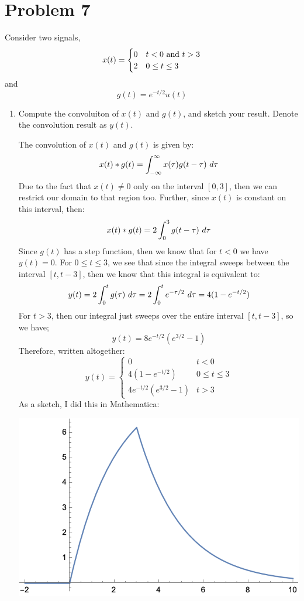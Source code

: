 \documentclass[10pt]{article}
\begin{document}
	\section*{Problem 7} 
	Consider two signals, 
	\[
	x(t) = \begin{cases}
		0 & \text{\(  t< 0 \) and \( t > 3 \)}\\
		2 & 0 \le t \le  3
	\end{cases}
	\] 
	and 
	\[
	g(t) = e^{-t / 2}u(t)
	\] 
	\begin{enumerate}[label=\alph*)]
		\item Compute the convoluiton of  \( x(t) \) and \( g(t) \), and sketch your result. Denote 
			the convolution result as \( y(t) \). 

			\begin{solution}
				The convolution of \( x(t) \) and \( g(t) \) is given by: 
				\[
				x(t) * g(t) = \int_{-\infty}^{\infty} x(\tau) g(t - \tau) \ d \tau 
				\] 
				Due to the fact that \( x(t) \neq 0  \) only on the interval \( [0, 3] \), then we can restrict
				our domain to that region too. Further, since \( x(t)  \) is constant on this interval, then:  
				\[
				x(t) * g(t) = 2\int_{0}^{3} g(t - \tau) \ d  \tau 
				\] 
				Since \( g(t) \) has a step function, then we know that for \( t < 0 \) we have \( y(t) = 0 \). 
				For \( 0 \le t \le 3 \), we see that since the integral sweeps between the interval 
				\( [t, t-3] \), then we know that  this integral is equivalent to: 
				\[
				y(t) = 2 \int_{0}^{t} g(\tau) \ d  \tau = 2 \int_{0}^{t} e^{-\tau / 2} \ d \tau = 
				4(1 - e^{- t / 2})  
				\] 
				For \( t > 3 \), then our integral just sweeps over the entire interval \( [t, t- 3] \), so 
				we have; 
				\[
				y(t) = 8e^{-t / 2}(e^{3 / 2} - 1)
				\] 
				Therefore, written altogether:
				\[
				y(t) = \begin{cases}
					0 & t < 0\\
					4(1 - e^{-t / 2}) & 0 \le  t \le  3\\
					4e^{-t / 2}(e^{3 / 2} - 1) & t > 3
				\end{cases}
				\] 
				As a sketch, I did this in Mathematica:
				\begin{center}
					\includegraphics{q7a.png}

\end{center}
\end{solution}
\end{enumerate}
\end{document}
